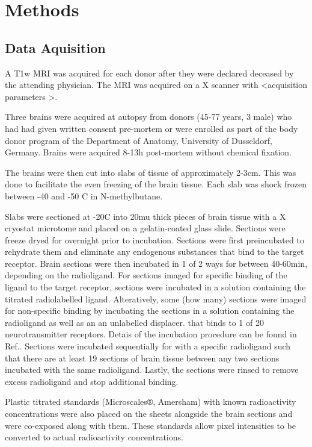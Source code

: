 \documentclass[12pt]{article}
\begin{document}
\section{Methods}
\subsection{Data Aquisition} 

A T1w MRI was acquired for each donor after they were declared deceased by the attending physician. The MRI was acquired on a X scanner with <acquisition parameters >. 

Three brains were acquired at autopsy from donors (45-77 years, 3 male) who had had given written consent pre-mortem or were enrolled as part of the body donor program of the Department of Anatomy, University of Dusseldorf, Germany. Brains were acquired 8-13h post-mortem without chemical fixation.

The brains were then cut into slabs of tissue of approximately 2-3cm. This was done to facilitate the even freezing of the brain tissue. Each slab was shock frozen between -40 and -50 C in N-methylbutane. 

Slabs were sectioned at -20C into 20mu thick pieces of brain tissue with a X cryostat microtome and placed on a gelatin-coated glass slide. Sections were freeze dryed for overnight prior to incubation. Sections were first preincubated to rehydrate them and eliminate any endogenous substances that bind to the target receptor. Brain sections were then incubated in 1 of 2 ways for between 40-60min, depending on the radioligand. For sections imaged for specific binding of the ligand to the target receptor, sections were incubated in a solution containing the titrated radiolabelled ligand. Alteratively, some (how many) sections were imaged for non-specific binding by  incubating the sections in a solution containing the radioligand as well as an an unlabelled displacer.  that binds to 1 of 20 neurotransmitter receptors. Detais of the incubation procedure can be found in Ref.\cite{Zilles2002quantiative}. Sections were incubated sequentially for with a specific radioligand such that there are at least 19 sections of brain tissue between any two sections incubated with the same radioligand. Lastly, the sections were rinsed to remove excess radioligand and stop additional binding.  

Plastic titrated standards (Microscales®, Amersham) with known radioactivity concentrations were also placed on the sheets alongside the brain sections and were co-exposed along with them. These standards allow pixel intensities to be converted to actual radioactivity concentrations.  
\end{document}
